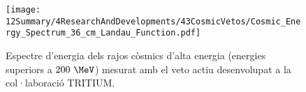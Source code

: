 \begin{enumerate}
\begin{figure}[h]
\texttt{[image: 12Summary/4ResearchAndDevelopments/43CosmicVetos/Cosmic\_Energy\_Spectrum\_36\_cm\_Landau\_Function.pdf]}
\centering
\caption{Espectre d'energia dels rajos còsmics d'alta energia (energies superiors a $200~\MeV$) mesurat amb el veto actiu desenvolupat a la col·laboració TRITIUM\label{fig:EspectreEnergeticVetoActiu}.}
\end{figure}

\end{enumerate} 